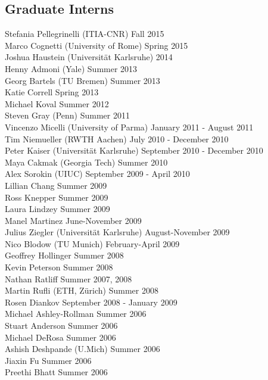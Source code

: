 \subsection{Graduate Interns}
\noindent
Stefania Pellegrinelli (ITIA-CNR) \hfill Fall 2015\\
Marco Cognetti (University of Rome) \hfill Spring 2015\\
Joshua Haustein (Universit\"at Karlsruhe) \hfill 2014\\
Henny Admoni (Yale) \hfill Summer 2013\\
Georg Bartels (TU Bremen) \hfill Summer 2013\\
Katie Correll  \hfill Spring 2013\\
Michael Koval  \hfill Summer 2012\\
Steven Gray (Penn) \hfill Summer 2011\\
Vincenzo Micelli (University of Parma) \hfill January 2011 - August 2011\\
Tim Niemueller (RWTH Aachen) \hfill July 2010 - December 2010\\ 
Peter Kaiser (Universit\"at Karlsruhe) \hfill September 2010 - December 2010\\ 
Maya Cakmak (Georgia Tech) \hfill Summer 2010\\ 
Alex Sorokin (UIUC) \hfill September 2009 - April 2010\\ 
Lillian Chang  \hfill Summer 2009\\
Ross Knepper  \hfill Summer 2009\\
Laura Lindzey  \hfill Summer 2009\\
Manel Martinez  \hfill June-November 2009\\
Julius Ziegler (Universit\"at Karlsruhe) \hfill August-November 2009\\
Nico Blodow (TU Munich) \hfill February-April 2009\\
Geoffrey Hollinger  \hfill Summer 2008\\
Kevin Peterson  \hfill Summer 2008\\
Nathan Ratliff  \hfill Summer 2007, 2008\\
Martin Rufli (ETH, Z\"urich) \hfill Summer 2008\\
Rosen Diankov  \hfill September 2008 - January 2009\\
Michael Ashley-Rollman  \hfill Summer 2006\\
Stuart Anderson  \hfill Summer 2006\\
Michael DeRosa  \hfill Summer 2006\\
Ashish Deshpande (U.Mich) \hfill Summer 2006\\
Jiaxin Fu  \hfill Summer 2006\\
Preethi Bhatt  \hfill Summer 2006\\

